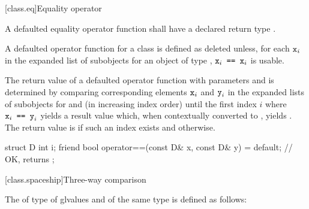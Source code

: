 [class.eq]{Equality operator}
%

\pnum
A defaulted equality operator function
shall have a declared return type .

\pnum
A defaulted \tcode{==} operator function for a class 
is defined as deleted
unless, for each $\texttt{\protect x}_i$ in the expanded list of subobjects
for an object  of type ,
$\tcode{x}_i\tcode{ == }\tcode{x}_i$
is usable.

\pnum
The return value of a defaulted \tcode{==} operator function
with parameters  and  is determined
by comparing corresponding elements $\texttt{\protect x}_i$ and $\texttt{\protect y}_i$
in the expanded lists of subobjects for  and 
(in increasing index order)
until the first index $i$
where $\tcode{x}_i\tcode{ == }\tcode{y}_i$ yields a result value which,
when contextually converted to , yields .
The return value is  if such an index exists
and  otherwise.

\pnum
\begin{example}
\begin{codeblock}
struct D {
  int i;
  friend bool operator==(const D& x, const D& y) = default;
                                                // OK, returns 
};
\end{codeblock}
\end{example}

[class.spaceship]{Three-way comparison}
%

\pnum
The 
of type 
of glvalues  and  of the same type
is defined as follows:


